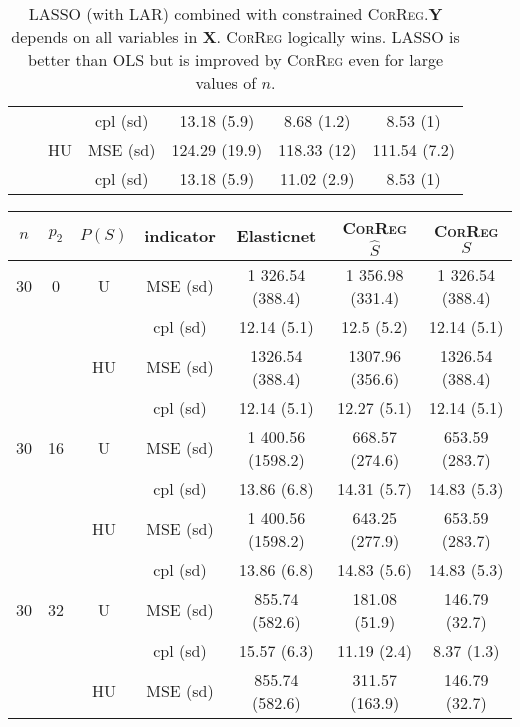 \documentclass[11pt,a4paper]{article}
\begin{document}
\begin{table}[h!]
\begin{tabular}{|c|c|c|c|c|c|c|}
& & & cpl (sd) & 13.18 (5.9) & 8.68 (1.2) & 8.53 (1) \\
 &  &HU & MSE (sd) & 124.29 (19.9) & 118.33 (12) & 111.54 (7.2) \\
& & & cpl (sd) & 13.18 (5.9) & 11.02 (2.9) & 8.53 (1) \\
\hline
\end{tabular} 
\caption{LASSO (with LAR) combined with constrained \textsc{CorReg}.$\boldsymbol{Y}$  depends on all variables in $\boldsymbol{X}$. \textsc{CorReg} logically wins. LASSO is better than OLS but is improved by \textsc{CorReg} even for large values of $n$.}\label{YXlinLASSO}
\end{table}

\begin{table}[h!]
\centering
\begin{tabular}{|c|c|c|c|c|c|c|}
\hline 
$n$ & $p_2$&  $P(S)$&indicator &Elasticnet  &    \textsc{CorReg} $\hat S$& \textsc{CorReg} $S$\\ 
\hline %
30 & 0 & U&MSE (sd) & 1 326.54 (388.4) & 1 356.98 (331.4) & 1 326.54 (388.4) \\
& & & cpl (sd) & 12.14 (5.1) & 12.5 (5.2) & 12.14 (5.1) \\
 &  &HU & MSE (sd) & 1326.54 (388.4) & 1307.96 (356.6) & 1326.54 (388.4) \\
& & & cpl (sd) & 12.14 (5.1) & 12.27 (5.1) & 12.14 (5.1) \\
\hline %
30 & 16 & U&MSE (sd) & 1 400.56 (1598.2) & 668.57 (274.6) & 653.59 (283.7) \\
& & & cpl (sd) & 13.86 (6.8) & 14.31 (5.7) & 14.83 (5.3) \\
 &  &HU &MSE (sd) & 1 400.56 (1598.2) & 643.25 (277.9) & 653.59 (283.7) \\
& & & cpl (sd) & 13.86 (6.8) & 14.83 (5.6) & 14.83 (5.3) \\
\hline %
30 & 32 & U & MSE (sd) & 855.74 (582.6) & 181.08 (51.9) & 146.79 (32.7) \\
& & & cpl (sd) & 15.57 (6.3) & 11.19 (2.4) & 8.37 (1.3) \\
 &  & HU & MSE (sd) & 855.74 (582.6) & 311.57 (163.9) & 146.79 (32.7) \\

\end{tabular}
\end{table}
\end{document}
